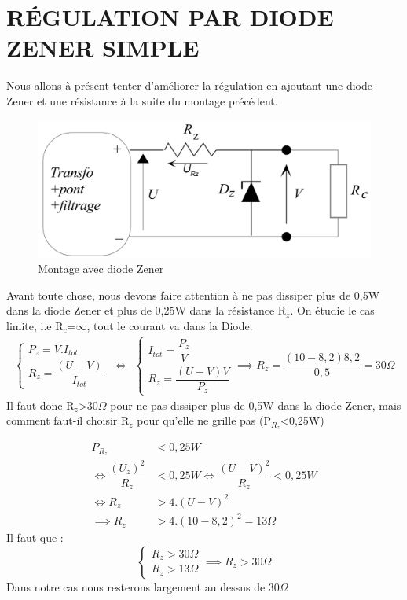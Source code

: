 \documentclass[12pt,a4paper]{article}
\begin{document}
\section{RÉGULATION PAR DIODE ZENER SIMPLE}
Nous allons à présent tenter d'améliorer la régulation en ajoutant une diode Zener et une résistance à la suite du montage précédent.
\begin{figure}[h]
\centering
\includegraphics[scale=0.25]{Zener}
\caption[Montage avec diode Zener]{Montage avec diode Zener}
\label{fig:zener}
\end{figure}
Avant toute chose, nous devons faire attention à ne pas dissiper plus de 0,5W dans la diode Zener et plus de 0,25W dans la résistance R$_{z}$. On étudie le cas limite, i.e R$_{c}$=$\infty$, tout le courant va dans la Diode.
\[
\begin{aligned}
\begin{cases}
P_{z}=V.I_{tot}\\
R_{z}=\dfrac{(U-V)}{I_{tot}}
\end{cases}
\end{aligned}
\iff
\begin{aligned}
\begin{cases}
I_{tot}=\dfrac{P_{z}}{V}\\
R_{z}=\dfrac{(U-V)V}{P_{z}}
\end{cases}
\implies R_{z}=\dfrac{(10-8,2)8,2}{0,5}=30\Omega
\end{aligned}
\]
Il faut donc R$_{z}$>30$\Omega$ pour ne pas dissiper plus de 0,5W dans la diode Zener, mais comment faut-il choisir R$_{z}$ pour qu'elle ne grille pas (P$_{R_{z}}$<0,25W)

\begin{align*}
P_{R_{z}}&<0,25W\\ \iff \dfrac{(U_{z})^{2}}{R_{z}}&<0,25W \iff \dfrac{(U-V)^{2}}{R_{z}}<0,25W\\
\iff R_{z}&>4.(U-V)^{2}\\
\implies R_{z}&>4.(10-8,2)^{2}=13\Omega
\end{align*}
Il faut que : 
\[
\begin{cases}
R_{z}>30\Omega\\
R_{z}>13\Omega
\end{cases}
\implies R_{z}>30\Omega
\]
Dans notre cas nous resterons largement au dessus de 30$\Omega$
\end{document}

